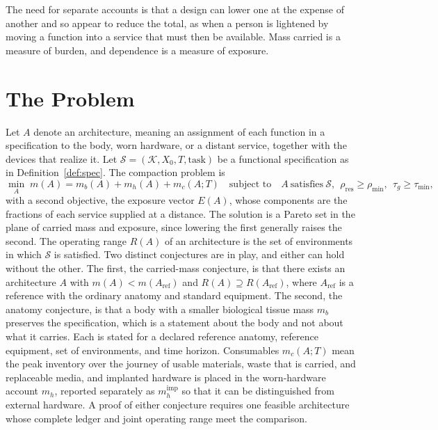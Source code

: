 \documentclass[11pt,openany]{book}
\theoremstyle{definition}
\theoremstyle{remark}
\newcommand{\Kset}{\mathcal{K}}
\newcommand{\Spec}{\mathcal{S}}
\begin{document}
The need for separate accounts is that a design can lower one at the expense of another and so appear to reduce the total, as when a person is lightened by moving a function into a service that must then be available. Mass carried is a measure of burden, and dependence is a measure of exposure.

\section{The Problem}

Let $A$ denote an architecture, meaning an assignment of each function in a specification to the body, worn hardware, or a distant service, together with the devices that realize it. Let $\Spec=(\Kset,X_0,T,\text{task})$ be a functional specification as in Definition~\ref{def:spec}. The compaction problem is
\begin{equation}
\min_{A}\; m(A)=m_b(A)+m_h(A)+m_c(A;T)\quad\text{subject to}\quad A\ \text{satisfies}\ \Spec,\ \ \rho_{\mathrm{res}}\ge\rho_{\min},\ \ \tau_g\ge\tau_{\min},
\label{eq:compaction}
\end{equation}
with a second objective, the exposure vector $E(A)$, whose components are the fractions of each service supplied at a distance. The solution is a Pareto set in the plane of carried mass and exposure, since lowering the first generally raises the second. The operating range $R(A)$ of an architecture is the set of environments in which $\Spec$ is satisfied. Two distinct conjectures are in play, and either can hold without the other. The first, the carried-mass conjecture, is that there exists an architecture $A$ with $m(A)<m(A_{\mathrm{ref}})$ and $R(A)\supseteq R(A_{\mathrm{ref}})$, where $A_{\mathrm{ref}}$ is a reference with the ordinary anatomy and standard equipment. The second, the anatomy conjecture, is that a body with a smaller biological tissue mass $m_b$ preserves the specification, which is a statement about the body and not about what it carries. Each is stated for a declared reference anatomy, reference equipment, set of environments, and time horizon. Consumables $m_c(A;T)$ mean the peak inventory over the journey of usable materials, waste that is carried, and replaceable media, and implanted hardware is placed in the worn-hardware account $m_h$, reported separately as $m_h^{\mathrm{imp}}$ so that it can be distinguished from external hardware. A proof of either conjecture requires one feasible architecture whose complete ledger and joint operating range meet the comparison.
\end{document}
